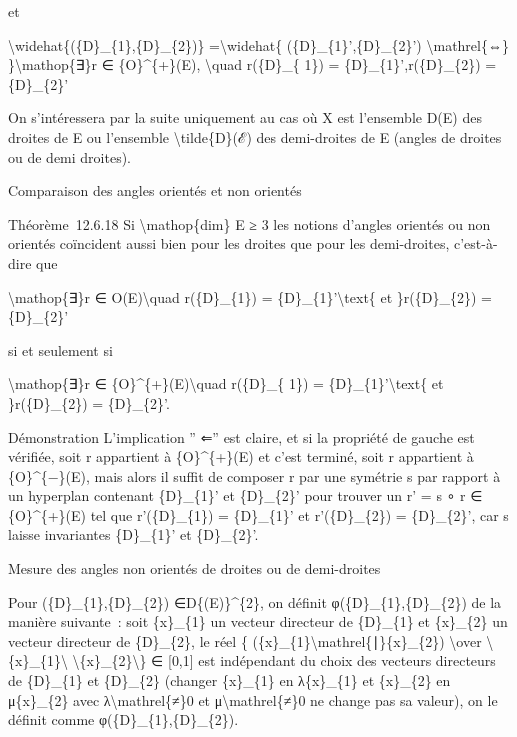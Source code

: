 \documentclass[]{article}
\begin{document}
et

\textbackslash{}widehat\{(\{D\}\_\{1\},\{D\}\_\{2\})\}
=\textbackslash{}widehat\{ (\{D\}\_\{1\}',\{D\}\_\{2\}')
\textbackslash{}mathrel\{⇔\} \}\textbackslash{}mathop\{∃\}r ∈
\{O\}\^{}\{+\}(E), \textbackslash{}quad r(\{D\}\_\{ 1\}) =
\{D\}\_\{1\}',r(\{D\}\_\{2\}) = \{D\}\_\{2\}'

On s'intéressera par la suite uniquement au cas où X est l'ensemble D(E)
des droites de E ou l'ensemble \textbackslash{}tilde\{D\}(ℰ) des
demi-droites de E (angles de droites ou de demi droites).

Comparaison des angles orientés et non orientés

Théorème~12.6.18 Si \textbackslash{}mathop\{dim\} E ≥ 3 les notions
d'angles orientés ou non orientés coïncident aussi bien pour les droites
que pour les demi-droites, c'est-à-dire que

\textbackslash{}mathop\{∃\}r ∈ O(E)\textbackslash{}quad r(\{D\}\_\{1\})
= \{D\}\_\{1\}'\textbackslash{}text\{ et \}r(\{D\}\_\{2\}) =
\{D\}\_\{2\}'

si et seulement si

\textbackslash{}mathop\{∃\}r ∈ \{O\}\^{}\{+\}(E)\textbackslash{}quad
r(\{D\}\_\{ 1\}) = \{D\}\_\{1\}'\textbackslash{}text\{ et
\}r(\{D\}\_\{2\}) = \{D\}\_\{2\}'.

Démonstration L'implication '' ⇐'' est claire, et si la propriété de
gauche est vérifiée, soit r appartient à \{O\}\^{}\{+\}(E) et c'est
terminé, soit r appartient à \{O\}\^{}\{−\}(E), mais alors il suffit de
composer r par une symétrie s par rapport à un hyperplan contenant
\{D\}\_\{1\}' et \{D\}\_\{2\}' pour trouver un r' = s ∘ r ∈
\{O\}\^{}\{+\}(E) tel que r'(\{D\}\_\{1\}) = \{D\}\_\{1\}' et
r'(\{D\}\_\{2\}) = \{D\}\_\{2\}', car s laisse invariantes \{D\}\_\{1\}'
et \{D\}\_\{2\}'.

Mesure des angles non orientés de droites ou de demi-droites

Pour (\{D\}\_\{1\},\{D\}\_\{2\}) ∈D\{(E)\}\^{}\{2\}, on définit
φ(\{D\}\_\{1\},\{D\}\_\{2\}) de la manière suivante~: soit \{x\}\_\{1\}
un vecteur directeur de \{D\}\_\{1\} et \{x\}\_\{2\} un vecteur
directeur de \{D\}\_\{2\}, le réel \{
\textbar{}(\{x\}\_\{1\}\textbackslash{}mathrel\{∣\}\{x\}\_\{2\})\textbar{}
\textbackslash{}over
\textbackslash{}\textbar{}\{x\}\_\{1\}\textbackslash{}\textbar{}
\textbackslash{}\textbar{}\{x\}\_\{2\}\textbackslash{}\textbar{}\} ∈
{[}0,1{]} est indépendant du choix des vecteurs directeurs de
\{D\}\_\{1\} et \{D\}\_\{2\} (changer \{x\}\_\{1\} en λ\{x\}\_\{1\} et
\{x\}\_\{2\} en μ\{x\}\_\{2\} avec λ\textbackslash{}mathrel\{≠\}0 et
μ\textbackslash{}mathrel\{≠\}0 ne change pas sa valeur), on le définit
comme φ(\{D\}\_\{1\},\{D\}\_\{2\}).
\end{document}
